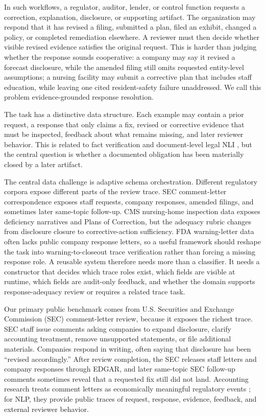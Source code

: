 \documentclass[11pt]{article}
\newcommand{\task}{evidence-grounded response resolution}
\begin{document}
In such workflows, a regulator, auditor, lender, or control function requests a correction, explanation, disclosure, or supporting artifact. The organization may respond that it has revised a filing, submitted a plan, filed an exhibit, changed a policy, or completed remediation elsewhere. A reviewer must then decide whether visible revised evidence satisfies the original request. This is harder than judging whether the response sounds cooperative: a company may say it revised a forecast disclosure, while the amended filing still omits requested entity-level assumptions; a nursing facility may submit a corrective plan that includes staff education, while leaving one cited resident-safety failure unaddressed. We call this problem \task{}.

The task has a distinctive data structure. Each example may contain a prior request, a response that only claims a fix, revised or corrective evidence that must be inspected, feedback about what remains missing, and later reviewer behavior. This is related to fact verification and document-level legal NLI \citep{thorne2018fever,koreeda2021contractnli}, but the central question is whether a documented obligation has been materially closed by a later artifact.

The central data challenge is adaptive schema orchestration. Different regulatory corpora expose different parts of the review trace. SEC comment-letter correspondence exposes staff requests, company responses, amended filings, and sometimes later same-topic follow-up. CMS nursing-home inspection data exposes deficiency narratives and Plans of Correction, but the adequacy rubric changes from disclosure closure to corrective-action sufficiency. FDA warning-letter data often lacks public company response letters, so a useful framework should reshape the task into warning-to-closeout trace verification rather than forcing a missing response role. A reusable system therefore needs more than a classifier. It needs a constructor that decides which trace roles exist, which fields are visible at runtime, which fields are audit-only feedback, and whether the domain supports response-adequacy review or requires a related trace task.

Our primary public benchmark comes from U.S. Securities and Exchange Commission (SEC) comment-letter review, because it exposes the richest trace. SEC staff issue comments asking companies to expand disclosure, clarify accounting treatment, remove unsupported statements, or file additional materials. Companies respond in writing, often saying that disclosure has been ``revised accordingly.'' After review completion, the SEC releases staff letters and company responses through EDGAR, and later same-topic SEC follow-up comments sometimes reveal that a requested fix still did not land. Accounting research treats comment letters as economically meaningful regulatory events \citep{cassell2013sec,bozanic2017sec,baugh2023auditor,ryans2021comment}; for NLP, they provide public traces of request, response, evidence, feedback, and external reviewer behavior.
\end{document}

